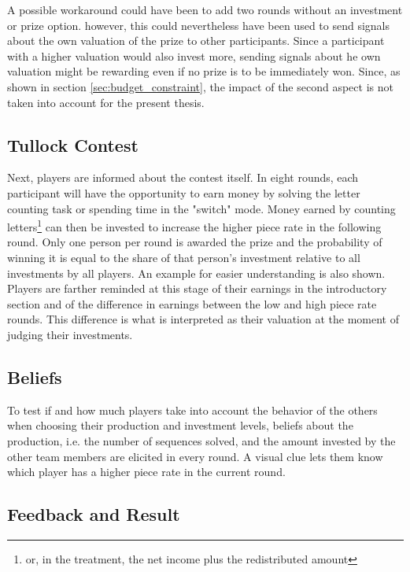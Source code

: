     A possible workaround could have been to add two rounds without an investment or prize option. however, this could nevertheless have been used to send signals about the own valuation of the prize to other participants. Since a participant with a higher valuation would also invest more, sending signals about he own valuation might be rewarding even if no prize is to be immediately won. Since, as shown in section \ref{sec:budget_constraint}, the impact of the second aspect is not taken into account for the present thesis. 
    
    \subsection{Tullock Contest}
    
    Next, players are informed  about the contest itself. In eight rounds, each participant will have the opportunity to earn money by solving the letter counting task or spending time in the "switch" mode. Money earned by counting letters\footnote{or, in the treatment, the net income plus the redistributed amount} can then be invested to increase the higher piece rate in the following round. Only one person per round is awarded the prize and the probability of winning it is equal to the share of that person's investment relative to all investments by all players. An example for easier understanding is also shown.\\
    
    Players are farther reminded at this stage of their earnings in the introductory section and of the difference in earnings between the low and high piece rate rounds. This difference is what is interpreted as their valuation at the moment of judging their investments.
    
    \subsection{Beliefs}
    
    To test if and how much players take into account the behavior of the others when choosing their production and investment levels, beliefs about the production, i.e. the number of sequences solved, and the amount invested by the other team members are elicited in every round. A visual clue lets them know which player has a higher piece rate in the current round.
    
    \subsection{Feedback and Result}
    
